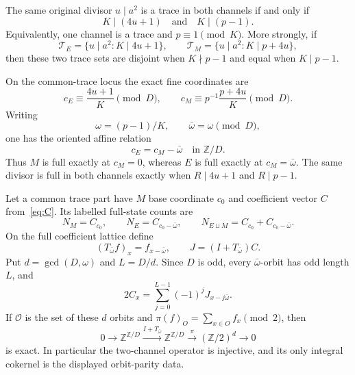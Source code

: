\begin{theorem}
\label{thm:affine-channels}
The same original divisor $u\mid a^2$ is a trace in both channels if and only if
\begin{equation}\label{eq:common-trace}
 K\mid(4u+1)\quad\text{and}\quad K\mid(p-1).
\end{equation}
Equivalently, one channel is a trace and $p\equiv1\pmod K$. More strongly, if
\[
 \mathcal T_E=\{u\mid a^2:K\mid4u+1\},\qquad
 \mathcal T_M=\{u\mid a^2:K\mid p+4u\},
\]
then these two trace sets are disjoint when $K\nmid p-1$ and equal when
$K\mid p-1$.

On the common-trace locus the exact fine coordinates are
\begin{equation}\label{eq:channel-coordinates}
 c_E\equiv\frac{4u+1}{K}\pmod D,\qquad
 c_M\equiv p^{-1}\frac{p+4u}{K}\pmod D.
\end{equation}
Writing
\[
 \omega=(p-1)/K,\qquad \bar\omega=\omega\pmod D,
\]
one has the oriented affine relation
\begin{equation}\label{eq:affine-shift}
 c_E=c_M-\bar\omega\quad\text{in }\mathbb Z/D.
\end{equation}
Thus $M$ is full exactly at $c_M=0$, whereas $E$ is full exactly at
$c_M=\bar\omega$. The same divisor is full in both channels exactly when
$R\mid4u+1$ and $R\mid p-1$.

Let a common trace part have $M$ base coordinate $c_0$ and coefficient vector
$C$ from~\eqref{eq:C}. Its labelled full-state counts are
\begin{equation}\label{eq:paired-count}
 N_M=C_{c_0},\qquad N_E=C_{c_0-\bar\omega},\qquad
 N_{E\sqcup M}=C_{c_0}+C_{c_0-\bar\omega}.
\end{equation}
On the full coefficient lattice define
\[
 (T_{\bar\omega}f)_x=f_{x-\bar\omega},\qquad
 J=(I+T_{\bar\omega})C.
\]
Put $d=\gcd(D,\omega)$ and $L=D/d$. Since $D$ is odd, every
$\bar\omega$-orbit has odd length $L$, and
\begin{equation}\label{eq:alternating-inverse}
 2C_x=\sum_{j=0}^{L-1}(-1)^jJ_{x-j\bar\omega}.
\end{equation}
If $\mathcal O$ is the set of these $d$ orbits and
$\pi(f)_O=\sum_{x\in O}f_x\pmod2$, then
\begin{equation}\label{eq:channel-exact-sequence}
0\longrightarrow\mathbb Z^{\mathbb Z/D}
 \xrightarrow{I+T_{\bar\omega}}\mathbb Z^{\mathbb Z/D}
 \xrightarrow{\pi}(\mathbb Z/2)^d\longrightarrow0
\end{equation}
is exact. In particular the two-channel operator is injective, and its only
integral cokernel is the displayed orbit-parity data.


\end{theorem}
